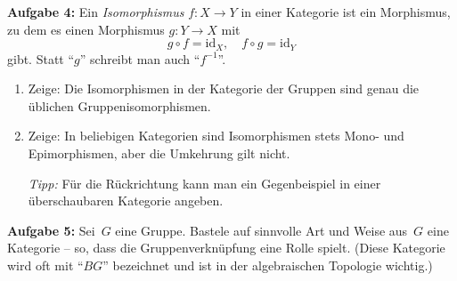 \documentclass[a4paper,ngerman]{scrartcl}
\theoremstyle{definition}
\theoremstyle{plain}
\theoremstyle{remark}
\newcommand{\id}{\mathrm{id}}
\begin{document}
\begin{list}{}{\wd\mybox \leftmargin\wd\mybox \itemsep 1.3em}
\item[\textbf{Aufgabe 4:}]
Ein \emph{Isomorphismus} $f:X \to Y$ in einer Kategorie ist ein
Morphismus, zu dem es einen Morphismus $g:Y \to X$ mit
\[ g \circ f = \id_X, \quad f \circ g = \id_Y \]
gibt. Statt "`$g$"' schreibt man auch "`$f^{-1}$"'.
\begin{enumerate}
\item Zeige: Die Isomorphismen in der Kategorie der Gruppen sind genau die
üblichen Gruppenisomorphismen.
\item Zeige: In beliebigen Kategorien sind Isomorphismen stets Mono- und
Epimorphismen, aber die Umkehrung gilt nicht.

\emph{Tipp:} Für die Rückrichtung kann man ein Gegenbeispiel in einer
über\-schau\-ba\-ren Kategorie angeben.
\end{enumerate}

\item[\textbf{Aufgabe 5:}]
Sei~$G$ eine Gruppe. Bastele auf sinnvolle Art und Weise aus~$G$ eine Kategorie
-- so, dass die Gruppenverknüpfung eine Rolle spielt. (Diese Kategorie wird oft
mit "`$BG$"' bezeichnet und ist in der algebraischen Topologie wichtig.)
\end{list}
\end{document}
